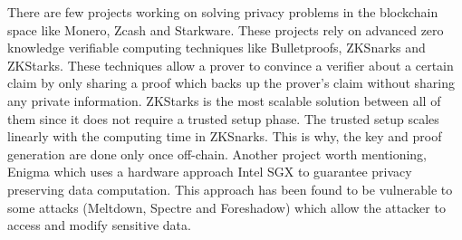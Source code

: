 \hspace{-5mm}There are few projects working on solving privacy problems in the blockchain space like Monero, Zcash and Starkware. These projects rely on advanced zero knowledge verifiable computing techniques like Bulletproofs, ZKSnarks  and ZKStarks. These techniques allow a prover to convince a verifier about a certain claim by only sharing a proof which backs up the prover’s claim without sharing any private information. ZKStarks is the most scalable solution between all of them since it does not require a trusted setup phase. The trusted setup scales linearly with the computing time in ZKSnarks. This is why, the key and proof generation are done only once off-chain. 
Another project worth mentioning, Enigma which uses a hardware approach Intel SGX to guarantee privacy preserving data computation. This approach has been found to be vulnerable to some attacks (Meltdown, Spectre and Foreshadow) which allow the attacker to access and modify sensitive data.





